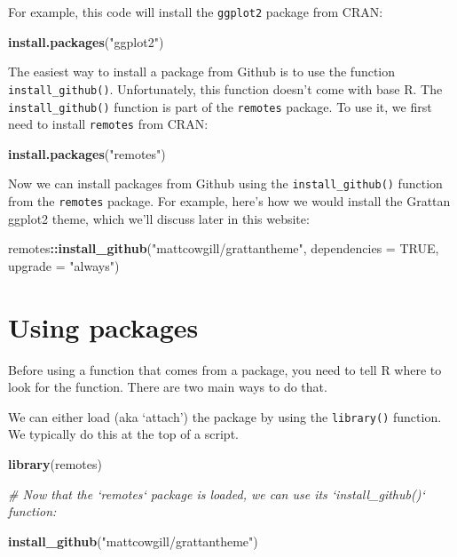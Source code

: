 \documentclass[]{book}
\newenvironment{Shaded}{\begin{snugshade}}{\end{snugshade}}
\newcommand{\CommentTok}[1]{\textcolor[rgb]{0.56,0.35,0.01}{\textit{#1}}}
\newcommand{\DataTypeTok}[1]{\textcolor[rgb]{0.13,0.29,0.53}{#1}}
\newcommand{\KeywordTok}[1]{\textcolor[rgb]{0.13,0.29,0.53}{\textbf{#1}}}
\newcommand{\NormalTok}[1]{#1}
\newcommand{\OperatorTok}[1]{\textcolor[rgb]{0.81,0.36,0.00}{\textbf{#1}}}
\newcommand{\OtherTok}[1]{\textcolor[rgb]{0.56,0.35,0.01}{#1}}
\newcommand{\StringTok}[1]{\textcolor[rgb]{0.31,0.60,0.02}{#1}}
\begin{document}
For example, this code will install the \texttt{ggplot2} package from CRAN:

\begin{Shaded}
\begin{Highlighting}[]
\KeywordTok{install.packages}\NormalTok{(}\StringTok{"ggplot2"}\NormalTok{)}
\end{Highlighting}
\end{Shaded}

The easiest way to install a package from Github is to use the function \texttt{install\_github()}. Unfortunately, this function doesn't come with base R. The \texttt{install\_github()} function is part of the \texttt{remotes} package. To use it, we first need to install \texttt{remotes} from CRAN:

\begin{Shaded}
\begin{Highlighting}[]
\KeywordTok{install.packages}\NormalTok{(}\StringTok{"remotes"}\NormalTok{)}
\end{Highlighting}
\end{Shaded}

Now we can install packages from Github using the \texttt{install\_github()} function from the \texttt{remotes} package. For example, here's how we would install the Grattan ggplot2 theme, which we'll discuss later in this website:

\begin{Shaded}
\begin{Highlighting}[]
\NormalTok{remotes}\OperatorTok{::}\KeywordTok{install_github}\NormalTok{(}\StringTok{"mattcowgill/grattantheme"}\NormalTok{, }\DataTypeTok{dependencies =} \OtherTok{TRUE}\NormalTok{, }\DataTypeTok{upgrade =} \StringTok{"always"}\NormalTok{)}
\end{Highlighting}
\end{Shaded}

\hypertarget{using-packages}{%
\section{Using packages}\label{using-packages}}

Before using a function that comes from a package, you need to tell R where to look for the function. There are two main ways to do that.

We can either load (aka `attach') the package by using the \texttt{library()} function. We typically do this at the top of a script.

\begin{Shaded}
\begin{Highlighting}[]
\KeywordTok{library}\NormalTok{(remotes)}

\CommentTok{# Now that the `remotes` package is loaded, we can use its `install_github()` function:}

\KeywordTok{install_github}\NormalTok{(}\StringTok{"mattcowgill/grattantheme"}\NormalTok{)}
\end{Highlighting}
\end{Shaded}
\end{document}
